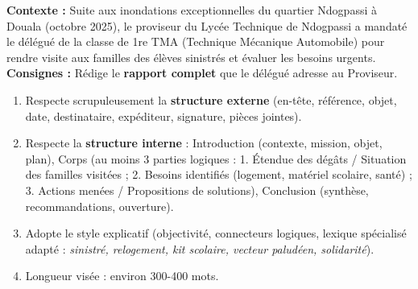\documentclass[11pt]{article}
\begin{document}
\begin{exercice}
\textbf{Contexte :} Suite aux inondations exceptionnelles du quartier Ndogpassi à Douala (octobre 2025), le proviseur du Lycée Technique de Ndogpassi a mandaté le délégué de la classe de 1re TMA (Technique Mécanique Automobile) pour rendre visite aux familles des élèves sinistrés et évaluer les besoins urgents.
\textbf{Consignes :} Rédige le \textbf{rapport complet} que le délégué adresse au Proviseur.
\begin{enumerate}
    \item Respecte scrupuleusement la \textbf{structure externe} (en-tête, référence, objet, date, destinataire, expéditeur, signature, pièces jointes).
    \item Respecte la \textbf{structure interne} : Introduction (contexte, mission, objet, plan), Corps (au moins 3 parties logiques : 1. Étendue des dégâts / Situation des familles visitées ; 2. Besoins identifiés (logement, matériel scolaire, santé) ; 3. Actions menées / Propositions de solutions), Conclusion (synthèse, recommandations, ouverture).
    \item Adopte le style explicatif (objectivité, connecteurs logiques, lexique spécialisé adapté : \emph{sinistré, relogement, kit scolaire, vecteur paludéen, solidarité}).
    \item Longueur visée : environ 300-400 mots.
\end{enumerate}
\end{exercice}
\end{document}

